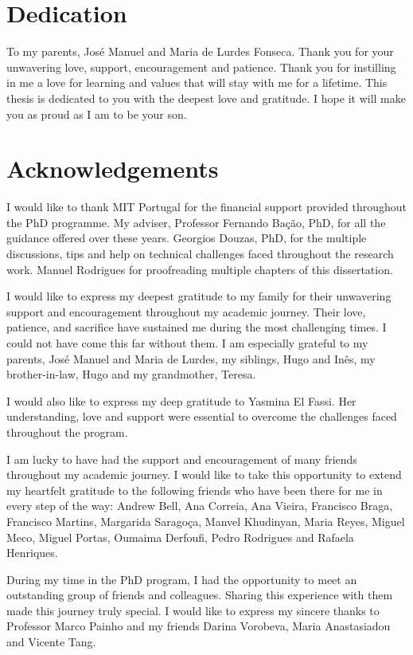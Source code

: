 \chapter*{Dedication}

To my parents, José Manuel and Maria de Lurdes Fonseca. Thank you for your
unwavering love, support, encouragement and patience. Thank you for instilling
in me a love for learning and values that will stay with me for a lifetime.
This thesis is dedicated to you with the deepest love and gratitude.  I hope
it will make you as proud as I am to be your son.

\chapter*{Acknowledgements}

I would like to thank MIT Portugal for the financial support provided
throughout the PhD programme. My adviser, Professor Fernando Bação, PhD, for
all the guidance offered over these years. Georgios Douzas, PhD, for the
multiple discussions, tips and help on technical challenges faced throughout
the research work. Manuel Rodrigues for proofreading multiple chapters of this
dissertation.

I would like to express my deepest gratitude to my family for their unwavering
support and encouragement throughout my academic journey. Their love,
patience, and sacrifice have sustained me during the most challenging times. I
could not have come this far without them. I am especially grateful to my
parents, José Manuel and Maria de Lurdes, my siblings, Hugo and Inês, my
brother-in-law, Hugo and my grandmother, Teresa. 

I would also like to express my deep gratitude to Yasmina El Fassi. Her
understanding, love and support were essential to overcome the 
challenges faced throughout the program.

I am lucky to have had the support and encouragement of many friends
throughout my academic journey. I would like to take this opportunity to
extend my heartfelt gratitude to the following friends who have been there for
me in every step of the way: Andrew Bell, Ana Correia, Ana Vieira, Francisco
Braga, Francisco Martins, Margarida Saragoça, Manvel Khudinyan, Maria Reyes,
Miguel Meco, Miguel Portas, Oumaima Derfoufi, Pedro Rodrigues and Rafaela
Henriques.

During my time in the PhD program, I had the opportunity to meet an
outstanding group of friends and colleagues. Sharing this experience with them
made this journey truly special. I would like to express my sincere thanks to
Professor Marco Painho and my friends Darina Vorobeva, Maria Anastasiadou and
Vicente Tang.

